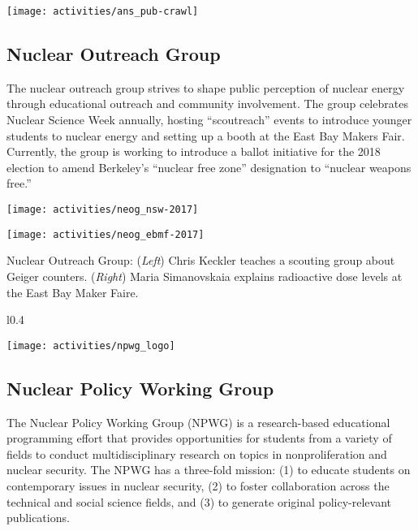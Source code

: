 \vspace{1.0cm}
\begin{center}
	\texttt{[image: activities/ans\_pub-crawl]}
\end{center}

\clearpage
\subsection*{Nuclear Outreach Group}
The nuclear outreach group strives to shape public perception of nuclear energy through educational outreach and community involvement. 
The group celebrates Nuclear Science Week annually, hosting “scoutreach” events to introduce younger students to nuclear energy and setting up a booth at the East Bay Makers Fair. 
Currently, the group is working to introduce a ballot initiative for the 2018 election to amend Berkeley’s “nuclear free zone” designation to “nuclear weapons free.”

\vspace{0.5cm}
\begin{minipage}{0.5\textwidth}
	\texttt{[image: activities/neog\_nsw-2017]}
\end{minipage}
\begin{minipage}{0.5\textwidth}
	\texttt{[image: activities/neog\_ebmf-2017]}
\end{minipage}

Nuclear Outreach Group: (\textit{Left}) Chris Keckler teaches a scouting group about Geiger counters. (\textit{Right}) Maria Simanovskaia explains radioactive dose levels at the East Bay Maker Faire.

\vspace{1.5cm}

\begin{wrapfigure}{l}{0.4\textwidth}
	\begin{center}
		\vspace{-0.5cm}
		\texttt{[image: activities/npwg\_logo]}
	\end{center}
\end{wrapfigure}

\subsection*{Nuclear Policy Working Group}

The Nuclear Policy Working Group (NPWG) is a research-based educational programming effort that provides opportunities for students from a variety of fields to conduct multidisciplinary research on topics in nonproliferation and nuclear security. 
The NPWG has a three-fold mission: (1) to educate students on contemporary issues in nuclear security, (2) to foster collaboration across the technical and social science fields, and (3) to generate original policy-relevant publications. 

